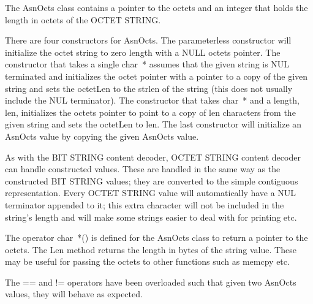 The {\C AsnOcts} class contains a pointer to the octets and an
integer that holds the length in octets of the OCTET STRING\@.

There are four constructors for {\C AsnOcts}.  The parameterless
constructor will initialize the octet string to zero length with a
{\C NULL} octets pointer.  The constructor that takes a single {\C char~*}
assumes that the given string is NUL terminated and initializes the octet
pointer with a pointer to a copy of the given string and sets the
{\C octetLen} to the {\C strlen} of the string (this does not usually
include the NUL terminator).  The constructor that takes
{\C char~*} and a length, {\C len}, initializes the octets pointer
to point to a copy of {\C len} characters from the given string and
sets the {\C octetLen} to {\C len}.  The last constructor will initialize
an {\C AsnOcts} value by copying the given {\C AsnOcts} value.

As with the BIT STRING content decoder, OCTET STRING content decoder
can handle constructed values.  These are handled in the same way as
the constructed BIT STRING values; they are converted to the simple
contiguous representation.  Every OCTET STRING value will
automatically have a NUL terminator appended to it; this extra
character will not be included in the string's length and will make
some strings easier to deal with for printing etc.

The {\C operator char~*()} is defined for the {\C AsnOcts} class to
return a pointer to the octets.  The {\C Len}
method returns the length in bytes of the string value.
These may be useful for passing the
octets to other functions such as {\C memcpy} etc.  

The {\C ==} and {\C !=} operators have been overloaded such that
given two {\C AsnOcts} values, they will behave as expected.



